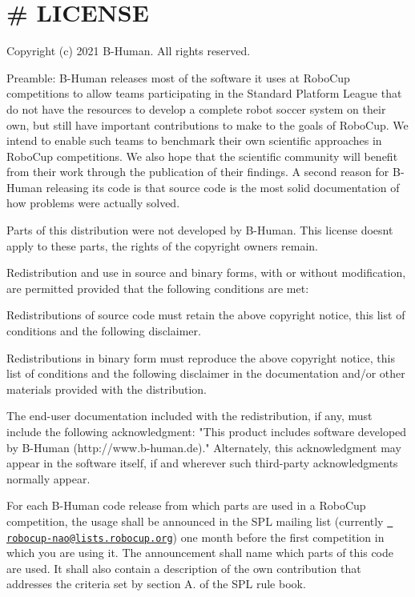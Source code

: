 \chapter{\# LICENSE}
\hypertarget{md__license}{}\label{md__license}
Copyright (c) 2021 B-\/\+Human. All rights reserved.

Preamble\+: B-\/\+Human releases most of the software it uses at Robo\+Cup competitions to allow teams participating in the Standard Platform League that do not have the resources to develop a complete robot soccer system on their own, but still have important contributions to make to the goals of Robo\+Cup. We intend to enable such teams to benchmark their own scientific approaches in Robo\+Cup competitions. We also hope that the scientific community will benefit from their work through the publication of their findings. A second reason for B-\/\+Human releasing its code is that source code is the most solid documentation of how problems were actually solved.

Parts of this distribution were not developed by B-\/\+Human. This license doesn\textquotesingle{}t apply to these parts, the rights of the copyright owners remain.

Redistribution and use in source and binary forms, with or without modification, are permitted provided that the following conditions are met\+:
\begin{DoxyEnumerate}
\item Redistributions of source code must retain the above copyright notice, this list of conditions and the following disclaimer.
\item Redistributions in binary form must reproduce the above copyright notice, this list of conditions and the following disclaimer in the documentation and/or other materials provided with the distribution.
\item The end-\/user documentation included with the redistribution, if any, must include the following acknowledgment\+: "{}\+This product includes software developed by B-\/\+Human     (http\+://www.\+b-\/human.\+de)."{} Alternately, this acknowledgment may appear in the software itself, if and wherever such third-\/party acknowledgments normally appear.
\item For each B-\/\+Human code release from which parts are used in a Robo\+Cup competition, the usage shall be announced in the SPL mailing list (currently \href{mailto:robocup-nao@lists.robocup.org}{\texttt{ robocup-\/nao@lists.\+robocup.\+org}}) one month before the first competition in which you are using it. The announcement shall name which parts of this code are used. It shall also contain a description of the own contribution that addresses the criteria set by section A. of the SPL rule book.
\end{DoxyEnumerate}


